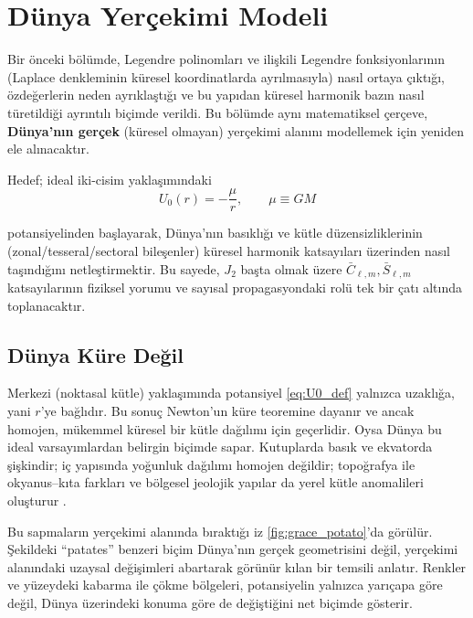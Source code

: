\chapter{Dünya Yerçekimi Modeli}
\label{ch:earth_model}

Bir önceki bölümde, Legendre polinomları ve ilişkili Legendre fonksiyonlarının (Laplace denkleminin küresel koordinatlarda ayrılmasıyla) nasıl ortaya çıktığı, özdeğerlerin neden ayrıklaştığı ve bu yapıdan küresel harmonik bazın nasıl türetildiği ayrıntılı biçimde verildi. Bu bölümde aynı matematiksel çerçeve, \textbf{Dünya'nın gerçek} (küresel olmayan) yerçekimi alanını modellemek için yeniden ele alınacaktır.

\medskip
\noindent
Hedef; ideal iki-cisim yaklaşımındaki
\begin{equation}
U_0(r)=-\frac{\mu}{r},\qquad \mu\equiv GM
\label{eq:U0_def}
\end{equation}

potansiyelinden başlayarak,
Dünya'nın basıklığı ve kütle düzensizliklerinin (zonal/tesseral/sectoral bileşenler)
küresel harmonik katsayıları üzerinden nasıl taşındığını netleştirmektir. Bu sayede, $J_2$ başta olmak üzere $\bar C_{\ell,m},\bar S_{\ell,m}$ katsayılarının fiziksel yorumu ve sayısal propagasyondaki rolü tek bir çatı altında toplanacaktır.



\newpage
\section{Dünya Küre Değil}
\label{sec:earth_not_perfect}

Merkezi (noktasal kütle) yaklaşımında potansiyel \eqref{eq:U0_def} yalnızca uzaklığa, yani $r$’ye bağlıdır.
Bu sonuç Newton’un küre teoremine dayanır ve ancak homojen, mükemmel küresel bir kütle dağılımı için geçerlidir.
Oysa Dünya bu ideal varsayımlardan belirgin biçimde sapar.
Kutuplarda basık ve ekvatorda şişkindir; iç yapısında yoğunluk dağılımı homojen değildir; topoğrafya ile okyanus--kıta farkları ve bölgesel jeolojik yapılar da yerel kütle anomalileri oluşturur \cite{Pavlis2008}.

\medskip
Bu sapmaların yerçekimi alanında bıraktığı iz \autoref{fig:grace_potato}'da görülür.
Şekildeki “patates” benzeri biçim Dünya’nın gerçek geometrisini değil, yerçekimi alanındaki uzaysal değişimleri abartarak görünür kılan bir temsili anlatır.
Renkler ve yüzeydeki kabarma ile çökme bölgeleri, potansiyelin yalnızca yarıçapa göre değil, Dünya üzerindeki konuma göre de değiştiğini net biçimde gösterir.

